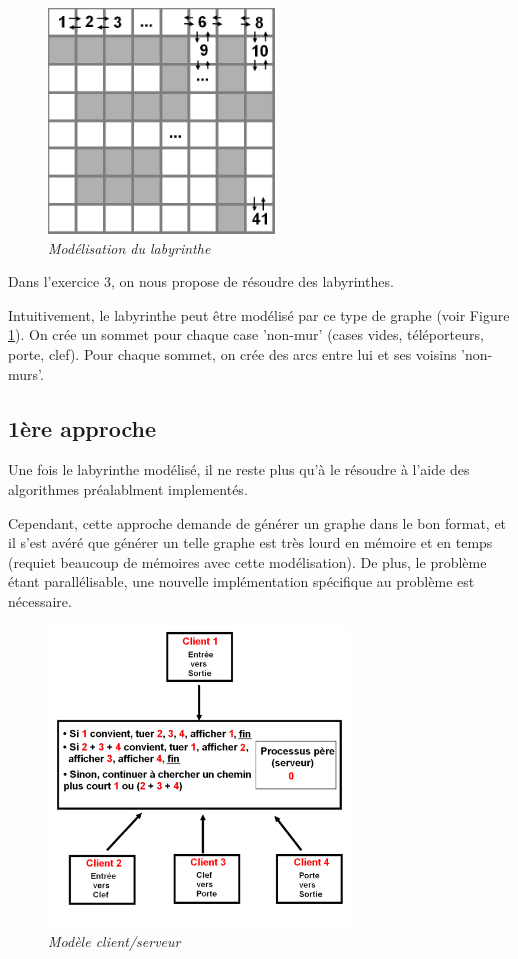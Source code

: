 \documentclass[10pt]{article}
\begin{document}
		\begin{figure}
			\includegraphics[width=6.0cm]{./images/lab.png}
			\caption{\textit{Modélisation du labyrinthe}}
			\label{modelisationlab}
		\end{figure}
		
		Dans l'exercice 3, on nous propose de résoudre des labyrinthes.\newline
		
		Intuitivement, le labyrinthe peut être modélisé par ce type de graphe (voir Figure \ref{modelisationlab}).
		On crée un sommet pour chaque case 'non-mur' (cases vides, téléporteurs, porte, clef).
		Pour chaque sommet, on crée des arcs entre lui et ses voisins 'non-murs'.\newline
			
		\subsection{1ère approche}
			Une fois le labyrinthe modélisé, il ne reste plus qu'à le résoudre à l'aide des algorithmes préalablment implementés.\newline
			
			Cependant, cette approche demande de générer un graphe dans le bon format, et il s'est avéré que générer un telle graphe est très lourd
			en mémoire et en temps (requiet beaucoup de mémoires avec cette modélisation).
			De plus, le problème étant parallélisable, une nouvelle implémentation spécifique au problème est nécessaire.
			
		\newpage
		\begin{figure}
			\includegraphics[width=8.0cm]{./images/exo3.png}
			\caption{\textit{Modèle client/serveur}}
			\label{exo3}
		\end{figure}
			
\end{document}
